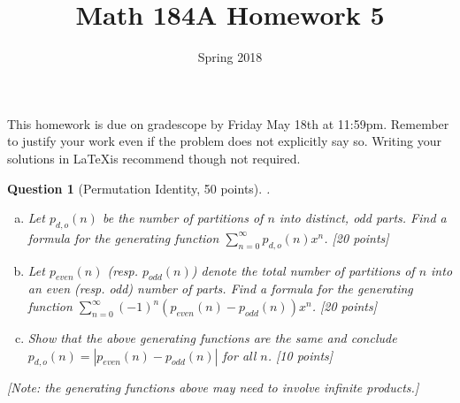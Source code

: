 \documentclass{article}
\title{Math 184A Homework 5}
\date{Spring 2018}
\newtheorem{ques}{Question}
\begin{document}
\maketitle

This homework is due on gradescope by Friday May 18th at 11:59pm. Remember to justify your work even if the problem does not explicitly say so. Writing your solutions in \LaTeX is recommend though not required.

\begin{ques}[Permutation Identity, 50 points].\\
\begin{enumerate}[(a)]
\item Let $p_{d,o}(n)$ be the number of partitions of $n$ into distinct, odd parts. Find a formula for the generating function $\sum_{n=0}^\infty p_{d,o}(n)x^n$. [20 points]
\item Let $p_{even}(n)$ (resp. $p_{odd}(n)$) denote the total number of partitions of $n$ into an even (resp. odd) number of parts. Find a formula for the generating function $\sum_{n=0}^\infty (-1)^n(p_{even}(n)-p_{odd}(n))x^n$. [20 points]
\item Show that the above generating functions are the same and conclude $p_{d,o}(n) = |p_{even}(n)-p_{odd}(n)|$ for all $n$. [10 points]
\end{enumerate}
[Note: the generating functions above may need to involve infinite products.]
\end{ques}
\end{document}
